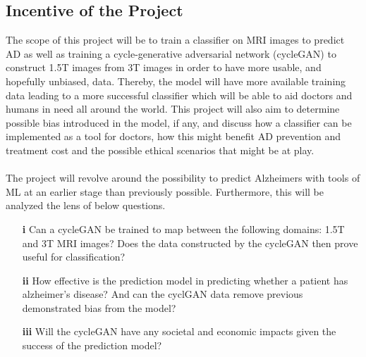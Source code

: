 \documentclass[12pt, fleqn, titlepage]{article}
\begin{document}
\subsection{Incentive of the Project}
The scope of this project will be to train a classifier on MRI images to predict AD as well as training a cycle-generative adversarial network (cycleGAN)
to construct 1.5T images from 3T images in order to have more usable, and
hopefully unbiased, data. Thereby, the model will have more available training
data leading to a more successful classifier which will be able to aid doctors and
humans in need all around the world. This project will also aim to determine
possible bias introduced in the model, if any, and discuss how a classifier can be
implemented as a tool for doctors, how this might benefit AD prevention and
treatment cost and the possible ethical scenarios that might be at play.
\\\\
The project will revolve around the possibility to predict Alzheimers with tools of ML at an
earlier stage than previously possible. Furthermore, this will be analyzed the lens of below questions.

\begin{itemize}
	\item[\textbf{i}] Can a cycleGAN be trained to map between the following domains: 1.5T and 3T MRI
	images? Does the data constructed by the cycleGAN then prove useful for classification?
	
	\item[\textbf{ii}] How effective is the prediction model in predicting whether a patient has
	alzheimer’s disease? And can the cyclGAN data remove previous demonstrated bias from the model?
	
	\item[\textbf{iii}] Will the cycleGAN have any societal and economic impacts
	given the success of the prediction model?
	
\end{itemize}
\end{document}
